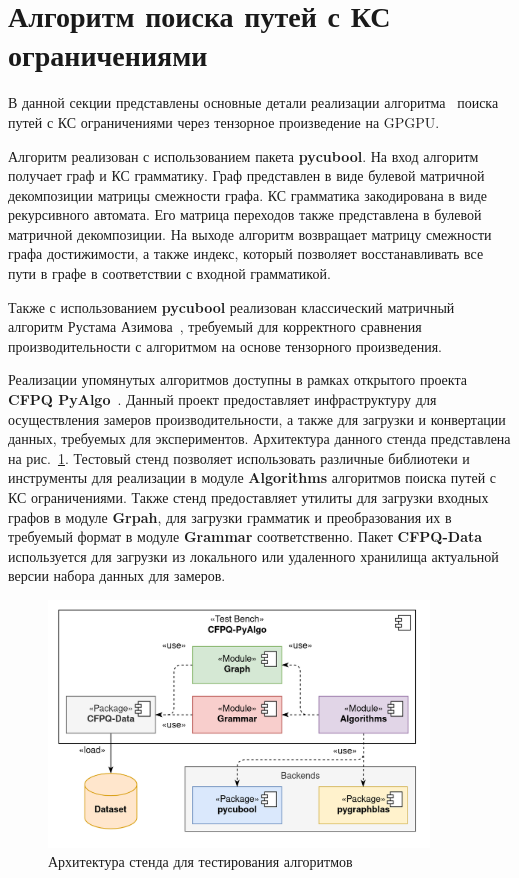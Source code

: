 \section{Алгоритм поиска путей с КС ограничениями}
\label{section:algo_impl}

В данной секции представлены основные детали реализации алгоритма~\cite{inbook:kronecker_cfpq_adbis} поиска путей с КС ограничениями через тензорное произведение на GPGPU.

Алгоритм реализован с использованием пакета \textbf{pycubool}. 
На вход алгоритм получает граф и КС грамматику. 
Граф представлен в виде булевой матричной декомпозиции матрицы смежности графа.
КС грамматика закодирована в виде рекурсивного автомата. 
Его матрица переходов также представлена в булевой матричной декомпозиции.
На выходе алгоритм возвращает матрицу смежности графа достижимости, а также индекс, 
который позволяет восстанавливать все пути в графе в соответствии с входной грамматикой.

Также с использованием \textbf{pycubool} реализован классический матричный алгоритм Рустама Азимова~\cite{inproceedings:matrix_cfpq}, требуемый для корректного сравнения производительности с алгоритмом на основе тензорного произведения.

Реализации упомянутых алгоритмов доступны в рамках открытого проекта \textbf{CFPQ PyAlgo}~\cite{net:cfpq_py_algo}.
Данный проект предоставляет инфраструктуру для осуществления замеров производительности, а также для загрузки и конвертации данных, требуемых для экспериментов.
Архитектура данного стенда представлена на рис.~\ref{fig:cfpq_py_algo}. 
Тестовый стенд позволяет использовать различные библиотеки и инструменты для реализации в модуле  \textbf{Algorithms} алгоритмов поиска путей с КС ограничениями. Также стенд предоставляет утилиты для загрузки входных графов в модуле \textbf{Grpah}, для загрузки грамматик и преобразования их в требуемый формат в модуле \textbf{Grammar} соответственно.
Пакет \textbf{CFPQ-Data}~\cite{net:cfpq_data} используется для загрузки из локального или удаленного хранилища актуальной версии набора данных для замеров.

\begin{figure}[]
    \centering
    \includegraphics[width=0.9\textwidth]{images/cfpq_pyalgo.png}
    \caption{Архитектура стенда для тестирования алгоритмов}
    \label{fig:cfpq_py_algo}
\end{figure}

